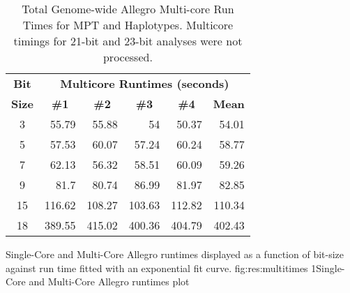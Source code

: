 \begin{table}[h]
\begin{center}
\begin{tabular}{crrrrr}\toprule
\textbf{Bit}  & \multicolumn{5}{c}{\textbf{Multicore Runtimes (seconds)}}  \\
\textbf{Size} & \multicolumn{1}{c}{\textbf{\#1}} & \multicolumn{1}{c}{\textbf{\#2}} & \multicolumn{1}{c}{\textbf{\#3}} & \multicolumn{1}{c}{\textbf{\#4}} & \multicolumn{1}{c}{\textbf{Mean}} \\
\midrule
3             & 55.79                            & 55.88                            & 54                               & 50.37                            & 54.01                             \\
5             & 57.53                            & 60.07                            & 57.24                            & 60.24                            & 58.77                             \\
7             & 62.13                            & 56.32                            & 58.51                            & 60.09                            & 59.26                             \\
9             & 81.7                             & 80.74                            & 86.99                            & 81.97                            & 82.85                             \\
15            & 116.62                           & 108.27                           & 103.63                           & 112.82                           & 110.34                            \\
18            & 389.55                           & 415.02                           & 400.36                           & 404.79                           & 402.43                            \\
\hline
\end{tabular}
\end{center}
\vspace{-15pt}
\caption[Total Genome-wide Allegro Multi-core Run Times for MPT and Haplotype Reconstruction]{Total Genome-wide Allegro Multi-core Run Times for MPT and Haplotypes. Multicore timings for 21-bit and 23-bit analyses were not processed.}\label{table:res:allegromultiruntimes}
\end{table}

	{Single-Core and Multi-Core Allegro runtimes displayed as a function of bit-size against run time fitted with an exponential fit curve.}
	{fig:res:multitimes}
	{1}{Single-Core and Multi-Core Allegro runtimes plot}

